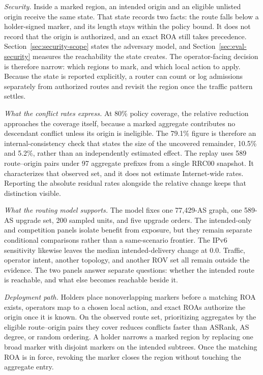 \label{sec:discussion}

{\revstart \emph{Security.} Inside a marked region, an intended origin and an eligible unlisted origin receive the same \openscope{} state. That state records two facts: the route falls below a holder-signed marker, and its length stays within the policy bound. It does not record that the origin is authorized, and an exact ROA still takes precedence. Section~\ref{sec:security-scope} states the adversary model, and Section~\ref{sec:eval-security} measures the reachability the state creates. The operator-facing decision is therefore narrow: which regions to mark, and which local action to apply. Because the state is reported explicitly, a router can count or log \openscope{} admissions separately from authorized routes and revisit the region once the traffic pattern settles.}

{\revstart \emph{What the conflict rates express.} At 80\% policy coverage, the relative reduction approaches the coverage itself, because a marked aggregate contributes no descendant conflict unless its origin is ineligible. The 79.1\% figure is therefore an internal-consistency check that states the size of the uncovered remainder, 10.5\% and 5.2\%, rather than an independently estimated effect. The replay uses 589 route--origin pairs under 97 aggregate prefixes from a single RRC00 snapshot. It characterizes that observed set, and it does not estimate Internet-wide rates. Reporting the absolute residual rates alongside the relative change keeps that distinction visible.}

{\revstart \emph{What the routing model supports.} The model fixes one 77,429-AS graph, one 589-AS upgrade set, 200 sampled units, and five upgrade orders. The intended-only and competition panels isolate benefit from exposure, but they remain separate conditional comparisons rather than a same-scenario frontier. The IPv6 sensitivity likewise leaves the median intended-delivery change at 0.0. Traffic, operator intent, another topology, and another ROV set all remain outside the evidence. The two panels answer separate questions: whether the intended route is reachable, and what else becomes reachable beside it.}

{\revstart \emph{Deployment path.} Holders place nonoverlapping markers before a matching ROA exists, operators map \openscope{} to a chosen local action, and exact ROAs authorize the origin once it is known. On the observed route set, prioritizing aggregates by the eligible route--origin pairs they cover reduces conflicts faster than ASRank, AS degree, or random ordering. A holder narrows a marked region by replacing one broad marker with disjoint markers on the intended subtrees. Once the matching ROA is in force, revoking the marker closes the region without touching the aggregate entry.}
